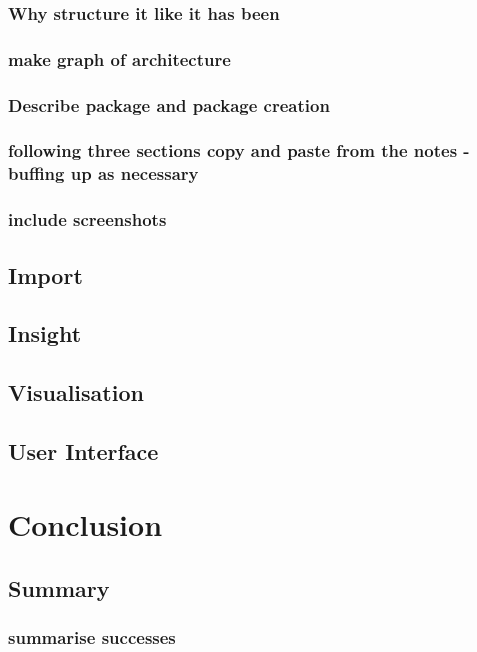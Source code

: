 \documentclass[11pt, a4paper, oneside]{report}
\begin{document}
\subsection{Why structure it like it has been}
\subsection{make graph of architecture}
\subsection{Describe package and package creation}
\subsection{following three sections copy and paste from the notes - buffing up as necessary}
\subsection{include screenshots}

\section{Import}
\label{sec:import}

\section{Insight}
\label{sec:insight}

\section{Visualisation}
\label{sec:visualisation}

\section{User Interface}
\label{sec:user-interface}

\chapter{Conclusion}
\label{cha:conclusion}

\section{Summary}
\label{sec:summary}

\subsection{summarise successes}
\end{document}
